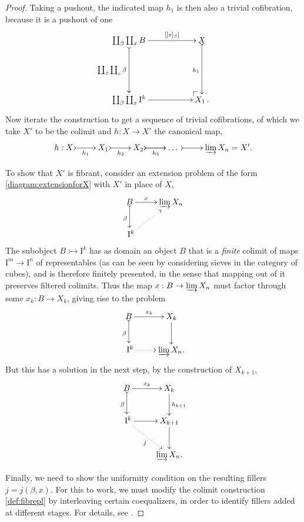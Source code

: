 \documentclass[11pt]{article}
\makeatletter
\newcommand{\pocorner}[1][dr]{\save*!/#1+1.2pc/#1:(1,-1)@^{|-}\restore}
\newcommand{\mono}{\ensuremath{\rightarrowtail}}
\newcommand{\ra}{\ensuremath{\rightarrow}}
\newcommand{\I}{\ensuremath{\mathrm{I}}}
\theoremstyle{remark}
\theoremstyle{definition}
\makeatother
\begin{document}
\begin{proof}
Taking a pushout, the indicated map $h_1$ is then also a trivial cofibration, because it is a pushout of one
\begin{equation*}%
\xymatrix{
{\coprod_{\beta}\coprod_{x} B} \ar@{>->}[dd]_-{\coprod_{\beta}\coprod_{x}\beta} {\ar[rr]^-{[[x]_\beta]}} && X \ar@{>->}[dd]_{h_1}\\
&&\\
{\coprod_{\beta}\coprod_{x} \I^{k}} \ar[rr] && {\pocorner} X_1\,.
}
\end{equation*}
Now iterate the construction to get a sequence of trivial cofibrations, of which we take $X'$ to be the colimit and $h :X\to X'$ the canonical map,
\begin{equation}\label{def:fibrepl}
\xymatrix{
h:X \ar@{>->}[r]_-{h_1} & X_1 \ar@{>->}[r]_-{h_2} & X_2 \ar@{>->}[r]_-{h_3} \ar@{>->}[r] & \dots\ \ar@{>->}[r] & {\varinjlim X_n} = X'.
}
\end{equation}

To show that $X'$ is fibrant, consider an extension problem of the form \eqref{diagram:extensionforX} with $X'$ in place of $X$,
\begin{equation*}%
\xymatrix{
B \ar@{>->}[d]_{\beta} \ar[r]^-x & {\varinjlim X_n}\\
\ \I^{k} \ar@{..>}[ru]&
}
\end{equation*}
The subobject $B\mono \I^k$ has as domain an object $B$ that is a \emph{finite} colimit of maps $\I^m \ra \I^n$ of representables (as can be seen by considering sieves in the category of cubes), and is therefore finitely presented, in the sense that mapping out of it preserves filtered colimits.  Thus the map $x: B \to {\varinjlim X_n}$ must factor through some $x_k: B \to X_k$, giving rise to the problem
\begin{equation*}%
\xymatrix{
B \ar@{>->}[d]_{\beta} \ar[r]^-{x_k}  & X_k \ar[d] \\
\ \I^{k} \ar@{..>}[r] &  {\varinjlim X_n}.
}
\end{equation*}
But this has a solution in the next step, by the construction of $X_{k+1}$,
\begin{equation*}%
\xymatrix{
B \ar@{>->}[d]_{\beta} \ar[r]^-{x_k} & X_k \ar[d]^{h_{k+1}} \\
\ \I^{k} \ar[r]  \ar@{..>}[rd]_j &  X_{k+1}\ar[d]\\
& {\varinjlim X_n}.
}
\end{equation*}

Finally, we need to show the uniformity condition on the resulting fillers $j = j(\beta,x)$.  For this to work, we must modify the colimit construction \eqref{def:fibrepl} by interleaving certain coequalizers, in order to identify fillers added at different stages.  For details, see \cite{Garner, Awodey}.
\end{proof}
\end{document}
